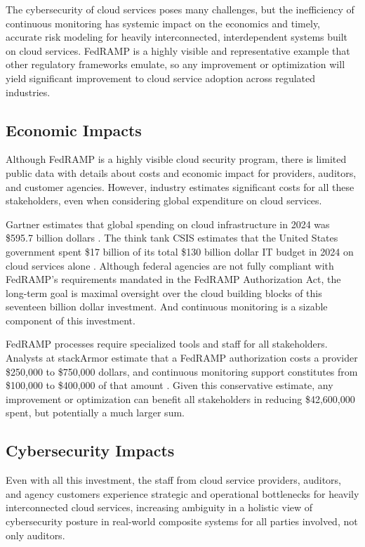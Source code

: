 \documentclass{jdf}
\begin{document}
The cybersecurity of cloud services poses many challenges, but the inefficiency of continuous monitoring has systemic impact on the economics and timely, accurate risk modeling for heavily interconnected, interdependent systems built on cloud services. FedRAMP is a highly visible and representative example that other regulatory frameworks emulate, so any improvement or optimization will yield significant improvement to cloud service adoption across regulated industries.

\subsection{Economic Impacts} \label{economics}

Although FedRAMP is a highly visible cloud security program, there is limited public data with details about costs and economic impact for providers, auditors, and customer agencies. However, industry estimates significant costs for all these stakeholders, even when considering global expenditure on cloud services.

Gartner estimates that global spending on cloud infrastructure in 2024 was \$595.7 billion dollars \citeyear{gartner24}. The think tank CSIS estimates that the United States government spent \$17 billion of its total \$130 billion dollar IT budget in 2024 on cloud services alone \citeyear[p.~1]{csis25}. Although federal agencies are not fully compliant with FedRAMP's requirements mandated in the FedRAMP Authorization Act, the long-term goal is maximal oversight over the cloud building blocks of this seventeen billion dollar investment. And continuous monitoring is a sizable component of this investment.

FedRAMP processes require specialized tools and staff for all stakeholders. Analysts at stackArmor estimate that a FedRAMP authorization costs a provider \$250,000 to \$750,000 dollars, and continuous monitoring support constitutes from \$100,000 to \$400,000 of that amount \citeyear{stackarmor24}. Given this conservative estimate, any improvement or optimization can benefit all stakeholders in reducing \$42,600,000 spent, but potentially a much larger sum.

\subsection{Cybersecurity Impacts}

Even with all this investment, the staff from cloud service providers, auditors, and agency customers experience strategic and operational bottlenecks for heavily interconnected cloud services, increasing ambiguity in a holistic view of cybersecurity posture in real-world composite systems for all parties involved, not only auditors. 
\end{document}
